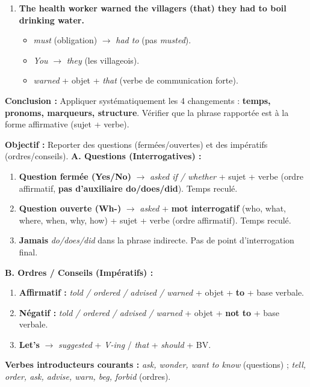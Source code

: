\documentclass[11pt]{article}
\begin{document}
\begin{exoresolu}
\begin{enumerate}
\begin{itemize}
    \end{itemize}
    \item \textbf{The health worker warned the villagers (that) they had to boil drinking water.}
    \begin{itemize}
        \item \emph{must} (obligation) $\rightarrow$ \emph{had to} (pas \emph{musted}).
        \item \emph{You} $\rightarrow$ \emph{they} (les villageois).
        \item \emph{warned} + objet + \emph{that} (verbe de communication forte).
    \end{itemize}
\end{enumerate}
\textbf{Conclusion :} Appliquer systématiquement les 4 changements : \textbf{temps, pronoms, marqueurs, structure}. Vérifier que la phrase rapportée est à la forme affirmative (sujet + verbe).
\end{exoresolu}

\begin{methode}
\textbf{Objectif :} Reporter des questions (fermées/ouvertes) et des impératifs (ordres/conseils).
\medskip
\textbf{A. Questions (Interrogatives) :}
\begin{enumerate}
    \item \textbf{Question fermée (Yes/No)} $\rightarrow$ \emph{asked if / whether} + sujet + verbe (ordre affirmatif, \textbf{pas d'auxiliaire do/does/did}). Temps reculé.
    \item \textbf{Question ouverte (Wh-)} $\rightarrow$ \emph{asked} + \textbf{mot interrogatif} (who, what, where, when, why, how) + sujet + verbe (ordre affirmatif). Temps reculé.
    \item \textbf{Jamais} \emph{do/does/did} dans la phrase indirecte. Pas de point d'interrogation final.
\end{enumerate}
\textbf{B. Ordres / Conseils (Impératifs) :}
\begin{enumerate}
    \item \textbf{Affirmatif :} \emph{told / ordered / advised / warned} + objet + \textbf{to} + base verbale.
    \item \textbf{Négatif :} \emph{told / ordered / advised / warned} + objet + \textbf{not to} + base verbale.
    \item \textbf{Let's} $\rightarrow$ \emph{suggested} + \emph{V-ing} / \emph{that} + \emph{should} + BV.
\end{enumerate}
\textbf{Verbes introducteurs courants :} \emph{ask, wonder, want to know} (questions) ; \emph{tell, order, ask, advise, warn, beg, forbid} (ordres).
\end{methode}
\end{document}
